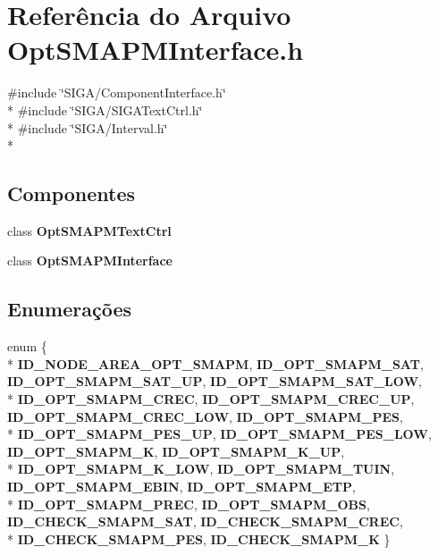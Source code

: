 \section{Referência do Arquivo Opt\+S\+M\+A\+P\+M\+Interface.\+h}
\label{_opt_s_m_a_p_m_interface_8h}
{\ttfamily \#include \char`\"{}S\+I\+G\+A/\+Component\+Interface.\+h\char`\"{}}\\*
{\ttfamily \#include \char`\"{}S\+I\+G\+A/\+S\+I\+G\+A\+Text\+Ctrl.\+h\char`\"{}}\\*
{\ttfamily \#include \char`\"{}S\+I\+G\+A/\+Interval.\+h\char`\"{}}\\*
\subsection*{Componentes}
\begin{DoxyCompactItemize}
\item 
class {\bf Opt\+S\+M\+A\+P\+M\+Text\+Ctrl}
\item 
class {\bf Opt\+S\+M\+A\+P\+M\+Interface}
\end{DoxyCompactItemize}
\subsection*{Enumerações}
\begin{DoxyCompactItemize}
\item 
enum \{ \\*
{\bf I\+D\+\_\+\+N\+O\+D\+E\+\_\+\+A\+R\+E\+A\+\_\+\+O\+P\+T\+\_\+\+S\+M\+A\+PM}, 
{\bf I\+D\+\_\+\+O\+P\+T\+\_\+\+S\+M\+A\+P\+M\+\_\+\+S\+AT}, 
{\bf I\+D\+\_\+\+O\+P\+T\+\_\+\+S\+M\+A\+P\+M\+\_\+\+S\+A\+T\+\_\+\+UP}, 
{\bf I\+D\+\_\+\+O\+P\+T\+\_\+\+S\+M\+A\+P\+M\+\_\+\+S\+A\+T\+\_\+\+L\+OW}, 
\\*
{\bf I\+D\+\_\+\+O\+P\+T\+\_\+\+S\+M\+A\+P\+M\+\_\+\+C\+R\+EC}, 
{\bf I\+D\+\_\+\+O\+P\+T\+\_\+\+S\+M\+A\+P\+M\+\_\+\+C\+R\+E\+C\+\_\+\+UP}, 
{\bf I\+D\+\_\+\+O\+P\+T\+\_\+\+S\+M\+A\+P\+M\+\_\+\+C\+R\+E\+C\+\_\+\+L\+OW}, 
{\bf I\+D\+\_\+\+O\+P\+T\+\_\+\+S\+M\+A\+P\+M\+\_\+\+P\+ES}, 
\\*
{\bf I\+D\+\_\+\+O\+P\+T\+\_\+\+S\+M\+A\+P\+M\+\_\+\+P\+E\+S\+\_\+\+UP}, 
{\bf I\+D\+\_\+\+O\+P\+T\+\_\+\+S\+M\+A\+P\+M\+\_\+\+P\+E\+S\+\_\+\+L\+OW}, 
{\bf I\+D\+\_\+\+O\+P\+T\+\_\+\+S\+M\+A\+P\+M\+\_\+K}, 
{\bf I\+D\+\_\+\+O\+P\+T\+\_\+\+S\+M\+A\+P\+M\+\_\+\+K\+\_\+\+UP}, 
\\*
{\bf I\+D\+\_\+\+O\+P\+T\+\_\+\+S\+M\+A\+P\+M\+\_\+\+K\+\_\+\+L\+OW}, 
{\bf I\+D\+\_\+\+O\+P\+T\+\_\+\+S\+M\+A\+P\+M\+\_\+\+T\+U\+IN}, 
{\bf I\+D\+\_\+\+O\+P\+T\+\_\+\+S\+M\+A\+P\+M\+\_\+\+E\+B\+IN}, 
{\bf I\+D\+\_\+\+O\+P\+T\+\_\+\+S\+M\+A\+P\+M\+\_\+\+E\+TP}, 
\\*
{\bf I\+D\+\_\+\+O\+P\+T\+\_\+\+S\+M\+A\+P\+M\+\_\+\+P\+R\+EC}, 
{\bf I\+D\+\_\+\+O\+P\+T\+\_\+\+S\+M\+A\+P\+M\+\_\+\+O\+BS}, 
{\bf I\+D\+\_\+\+C\+H\+E\+C\+K\+\_\+\+S\+M\+A\+P\+M\+\_\+\+S\+AT}, 
{\bf I\+D\+\_\+\+C\+H\+E\+C\+K\+\_\+\+S\+M\+A\+P\+M\+\_\+\+C\+R\+EC}, 
\\*
{\bf I\+D\+\_\+\+C\+H\+E\+C\+K\+\_\+\+S\+M\+A\+P\+M\+\_\+\+P\+ES}, 
{\bf I\+D\+\_\+\+C\+H\+E\+C\+K\+\_\+\+S\+M\+A\+P\+M\+\_\+K}
 \}
\end{DoxyCompactItemize}
